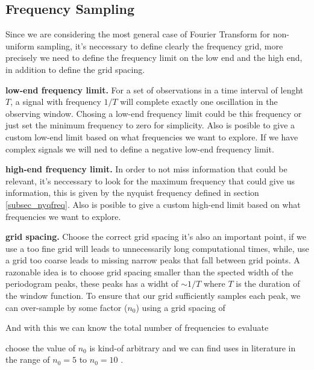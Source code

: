 \subsection{Frequency Sampling}{\label{subsec_freqsampling}}
\newp Since we are considering the most general case of Fourier Transform for non-uniform sampling, it's neccessary to define clearly the frequency grid, more precisely we need to define the frequency limit on the low end and the high end, in addition to define the grid spacing.
\begin{description}

\item \textbf{low-end frequency limit.} For a set of observations in a time interval of lenght $T$, a signal with frequency $1/T$ will complete exactly one oscillation in the observing window. Chosing a low-end frequency limit could be this frequency or just set the minimum frequency to zero for simplicity. Also is posible to give a custom low-end limit based on what frequencies we want to explore. If we have complex signals we will ned to define a negative low-end frequency limit.

\item \textbf{high-end frequency limit.} In order to not miss information that could be relevant, it's neccessary to look for the maximum frequency that could give us information, this is given by the nyquist frequency defined in section \ref{subsec_nyqfreq}. Also is posible to give a custom high-end limit based on what frequencies we want to explore.

\item \textbf{grid spacing.} Choose the correct grid spacing it's also an important point, if we use a too fine grid will leads to unnecessarily long computational times, while, use a grid too coarse leads to missing narrow peaks that fall between grid points. A razonable idea is to choose grid spacing smaller than the spected width of the periodogram peaks, these peaks has a widht of $\sim 1/T$ where $T$ is the duration of the window function. To ensure that our grid sufficiently samples each peak, we can over-sample by some factor ($n_0$) using a grid spacing of


\newp And with this we can know the total number of frequencies to evaluate


\newp choose the value of $n_0$ is kind-of arbitrary and we can find uses in literature in the range of $n_0 = 5$ to $n_0 = 10$ \cite{vanderplas-lombScargle}.

\end{description}

